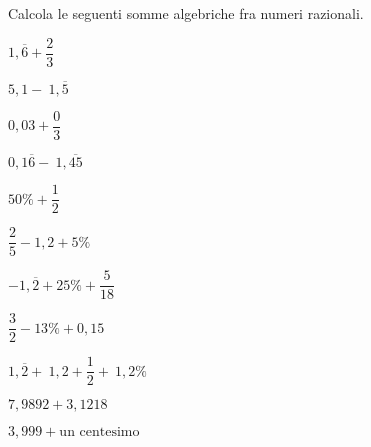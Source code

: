 \begin{esercizio}
 \label{ese:3.45}
Calcola le seguenti somme algebriche fra numeri razionali.
\begin{multicols}{3}
\begin{enumeratea}
\spazielenx
\item \(1,\overline{6} +\dfrac{2}{3}\)
\item \(5,1 -~1,\overline{5}\)
\item \(0,03+ \dfrac{0}{3}\)
\item \(0,1\overline{6} -~1,\overline{45}\)
\item \(50\% + \dfrac{1}{2}\)
\item \(\dfrac{2}{5}-1,2+5\%~\)
\item \(-1,\overline{2}+25\%+\dfrac{5}{18}\)
\item \(\dfrac{3}{2} -13\% +0,15\)
\item \(1,\overline{2} +~1,2 + \dfrac{1}{2} +~1,2\%~\)
\item \(7,9892+3,1218\)
\item \(3,999+ \text{un centesimo}\)
\end{enumeratea}
\end{multicols}
\end{esercizio}

